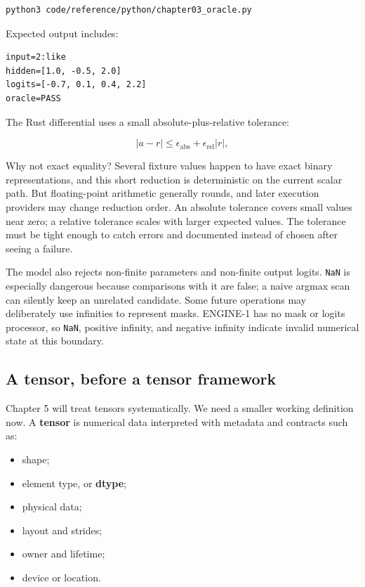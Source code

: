 \documentclass[
  10pt,
]{article}
\providecommand{\tightlist}{%
  \setlength{\itemsep}{0pt}\setlength{\parskip}{0pt}}
\begin{document}
\begin{verbatim}
python3 code/reference/python/chapter03_oracle.py
\end{verbatim}

Expected output includes:

\begin{verbatim}
input=2:like
hidden=[1.0, -0.5, 2.0]
logits=[-0.7, 0.1, 0.4, 2.2]
oracle=PASS
\end{verbatim}

The Rust differential uses a small absolute-plus-relative tolerance:

\[
|a-r|\le \epsilon_{\mathrm{abs}}+
\epsilon_{\mathrm{rel}}|r|,
\]

Why not exact equality? Several fixture values happen to have exact
binary representations, and this short reduction is deterministic on the
current scalar path. But floating-point arithmetic generally rounds, and
later execution providers may change reduction order. An absolute
tolerance covers small values near zero; a relative tolerance scales
with larger expected values. The tolerance must be tight enough to catch
errors and documented instead of chosen after seeing a failure.

The model also rejects non-finite parameters and non-finite output
logits. \texttt{NaN} is especially dangerous because comparisons with it
are false; a naive argmax scan can silently keep an unrelated candidate.
Some future operations may deliberately use infinities to represent
masks. ENGINE-1 has no mask or logits processor, so \texttt{NaN},
positive infinity, and negative infinity indicate invalid numerical
state at this boundary.

\subsection{A tensor, before a tensor
framework}\label{a-tensor-before-a-tensor-framework}

Chapter 5 will treat tensors systematically. We need a smaller working
definition now. A \textbf{tensor} is numerical data interpreted with
metadata and contracts such as:

\begin{itemize}
\tightlist
\item
  shape;
\item
  element type, or \textbf{dtype};
\item
  physical data;
\item
  layout and strides;
\item
  owner and lifetime;
\item
  device or location.
\end{itemize}
\end{document}
